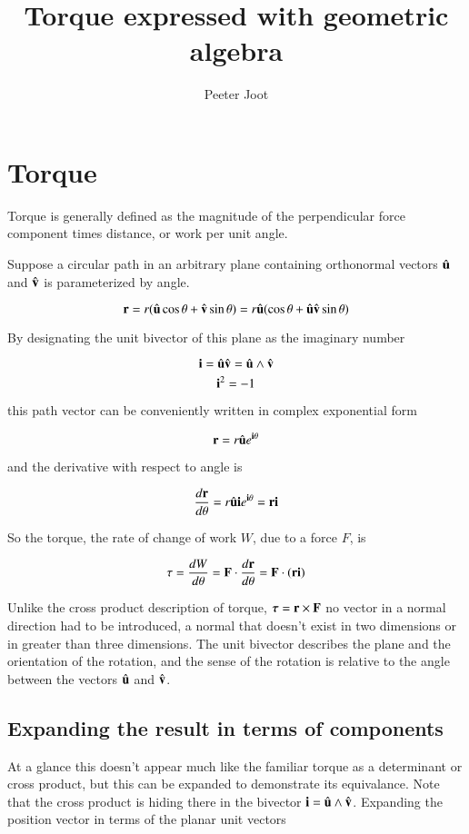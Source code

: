 \documentclass{article}      %
\title{Torque expressed with geometric algebra} %
\author{Peeter Joot}         %
\newcommand{\dtheta}[1]{\frac{d {#1}}{d \theta}}
\begin{document}

\maketitle{}

\section{Torque}

Torque is generally defined as the magnitude of the perpendicular force component times distance, or work per unit angle.

Suppose a circular path in an arbitrary plane containing orthonormal vectors $\hat{\mathbf{u}}$ and $\hat{\mathbf{v}}$ is parameterized by angle.

\[
\mathbf{r} = r(\hat{\mathbf{u}} \cos \theta + \hat{\mathbf{v}} \sin \theta) = r \hat{\mathbf{u}}(\cos \theta + \hat{\mathbf{u}} \hat{\mathbf{v}} \sin \theta)
\]

By designating the unit bivector of this plane as the imaginary number

\[
\mathbf{i}  = \hat{\mathbf{u}} \hat{\mathbf{v}} = \hat{\mathbf{u}} \wedge \hat{\mathbf{v}}
\]
\[
\mathbf{i} ^2 = -1
\]

this path vector can be conveniently written in complex exponential form

\[
\mathbf{r} = r \hat{\mathbf{u}} e^{\mathbf{i} \theta}
\]

and the derivative with respect to angle is

\[
\dtheta{\Br} = r \ucap \Bi  e^{\Bi  \theta} = \Br  \Bi 
\]

So the torque, the rate of change of work $W$, due to a force $F$, is

\[
\tau = \dtheta{W} = \BF \cdot \dtheta{\Br} = \BF \cdot (\Br  \Bi )
\]

Unlike the cross product description of torque, $\boldsymbol{\tau} = \mathbf{r} \times \mathbf{F}$ no vector in a normal direction had to be introduced, a normal that doesn't exist in two dimensions or in greater than three dimensions.  The unit bivector describes the plane and the orientation of the rotation, and the sense of the rotation is relative to the angle between the vectors $\hat{\mathbf{u}}$ and $\hat{\mathbf{v}}$.

\subsection{Expanding the result in terms of components }

At a glance this doesn't appear much like the familiar torque as a determinant or cross product, but this can be expanded to demonstrate its equivalance.  Note that the cross product is hiding there in the bivector $\mathbf{i} = \hat{\mathbf{u}} \wedge \hat{\mathbf{v}}$.  Expanding the position vector in terms of the planar unit vectors 
\end{document}
